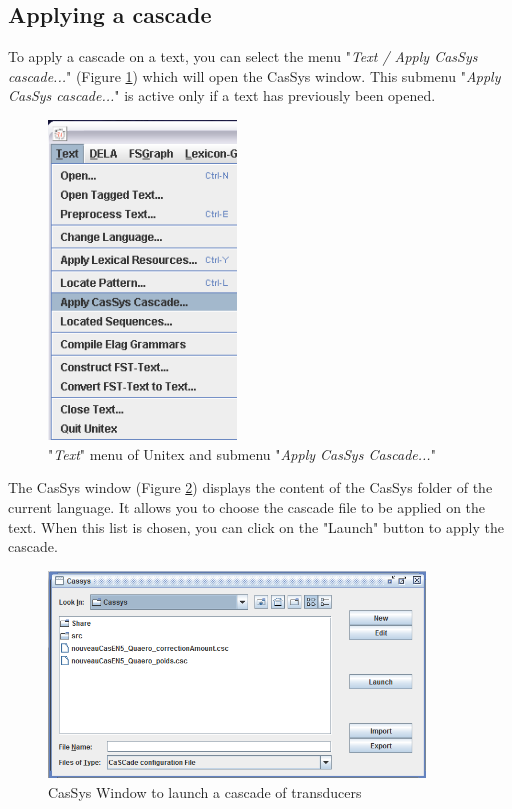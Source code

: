 	
\subsection{Applying a cascade}
\label{subsec:launchCascade}

To apply a cascade on a text, you can select the menu "\textit{Text / Apply CasSys cascade...}" (Figure \ref{fig13-01}) which will open the CasSys window.
This submenu "\textit{Apply CasSys cascade...}" is active only if a text has previously been opened.

\begin{figure}[!htb]
 \centering
 \includegraphics[width=5cm]{resources/img/fig13-01.png}
 \caption{"\textit{Text}" menu of Unitex and submenu "\textit{Apply CasSys Cascade...}"}
 \label{fig13-01}
\end{figure}


The CasSys window (Figure \ref{fig13-02}) displays the content of the CasSys folder of the current language. It allows you to choose 
the cascade file to be applied on the text. When this list is chosen, you can click on the "Launch" button to apply the cascade.

\begin{figure}[!htb]
  \centering
  \includegraphics[width=10cm]{resources/img/fig13-02.png}
  \caption{CasSys Window to launch a cascade of transducers}
  \label{fig13-02}
\end{figure}

